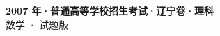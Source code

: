 \documentclass[zihao=-4, a4paper]{ctexart}
\begin{document}
\begin{center}
  {\Large\bfseries 2007 年·普通高等学校招生考试·辽宁卷·理科}\\[4pt]
  {\large 数学 · 试题版}
\end{center}
\medskip
{}

\end{document}
